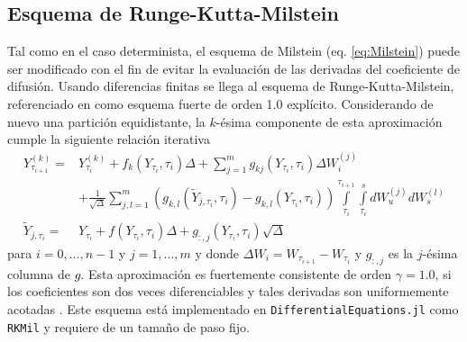 \subsection{Esquema de Runge-Kutta-Milstein}
Tal como en el caso determinista, el esquema de Milstein (eq. \ref{eq:Milstein})
puede ser modificado con el fin de evitar la evaluación de las derivadas del coeficiente
de difusión. Usando diferencias finitas se llega al esquema de Runge-Kutta-Milstein, 
referenciado en \cite{kloedenNumericalSolutionStochastic1992} como esquema fuerte de orden
1.0 explícito. Considerando de nuevo una partición equidistante, la $k$-ésima 
componente de esta aproximación cumple la siguiente relación iterativa
\begin{equation}\label{eq:Runge-Kutta-Milstein}
    \begin{split}
    Y_{\tau_{i+1}}^{(k)}=&Y_{\tau_i}^{(k)} + f_k(Y_{\tau_i},\tau_i)\Delta + 
    \sum_{j=1}^m g_{kj}(Y_{\tau_i},\tau_i)\Delta W_i^{(j)}\\ &
    + \frac{1}{\sqrt{\Delta}}\sum_{j,l=1}^m \left(g_{k,l}(\tilde Y_{j,\tau_i}, \tau_i)- g_{k,l}(Y_{\tau_i},\tau_i) 
    \right)\int\limits^{\tau_{i+1}}_{\tau_i} \int\limits^s_{\tau_i}dW_u^{(j)}dW_s^{(l)}\\
    \tilde Y_{j,\tau_i}=& Y_{\tau_i}+f(Y_{\tau_i},\tau_i)\Delta + g_{:,j}(Y_{\tau_i},\tau_i)\sqrt{\Delta}
    \end{split}
\end{equation}
para $i=0,...,n-1$ y $j=1,...,m$ y donde $\Delta W_{i}=W_{\tau_{i+1}}-W_{\tau_i}$ y $g_{:,j}$ es la $j$-ésima
columna de $g$. Esta aproximación es fuertemente consistente de orden $\gamma = 1.0$, si los
coeficientes son dos veces diferenciables y tales derivadas son uniformemente acotadas \cite{fuchsInferenceDiffusionProcesses2013}.
Este esquema está implementado en \texttt{DifferentialEquations.jl} como \texttt{RKMil} y requiere de
un tamaño de paso fijo.
